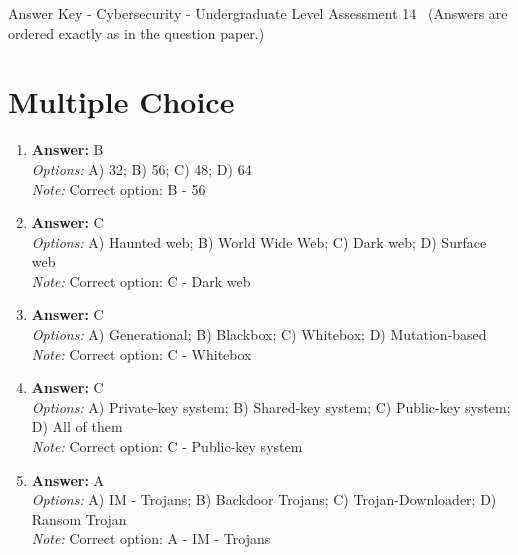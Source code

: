 \documentclass[12pt]{article}
\begin{document}
\begin{center}
Answer Key - Cybersecurity - Undergraduate Level Assessment 14 \
\small (Answers are ordered exactly as in the question paper.)
\end{center}

\section*{Multiple Choice}
\begin{enumerate}[label=\arabic*.]
\item \textbf{Answer:} B
\\ \textit{Options:} A) 32; B) 56; C) 48; D) 64
\\ \textit{Note:} Correct option: B - 56
\item \textbf{Answer:} C
\\ \textit{Options:} A) Haunted web; B) World Wide Web; C) Dark web; D) Surface web
\\ \textit{Note:} Correct option: C - Dark web
\item \textbf{Answer:} C
\\ \textit{Options:} A) Generational; B) Blackbox; C) Whitebox; D) Mutation-based
\\ \textit{Note:} Correct option: C - Whitebox
\item \textbf{Answer:} C
\\ \textit{Options:} A) Private-key system; B) Shared-key system; C) Public-key system; D) All of them
\\ \textit{Note:} Correct option: C - Public-key system
\item \textbf{Answer:} A
\\ \textit{Options:} A) IM - Trojans; B) Backdoor Trojans; C) Trojan-Downloader; D) Ransom Trojan
\\ \textit{Note:} Correct option: A - IM - Trojans
\end{enumerate}
\end{document}
